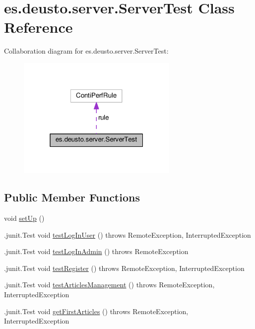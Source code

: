 \hypertarget{classes_1_1deusto_1_1server_1_1_server_test}{}\section{es.\+deusto.\+server.\+Server\+Test Class Reference}
\label{classes_1_1deusto_1_1server_1_1_server_test}


Collaboration diagram for es.\+deusto.\+server.\+Server\+Test\+:\nopagebreak
\begin{figure}[H]
\begin{center}
\leavevmode
\includegraphics[width=220pt]{classes_1_1deusto_1_1server_1_1_server_test__coll__graph}
\end{center}
\end{figure}
\subsection*{Public Member Functions}
\begin{DoxyCompactItemize}
\item 
void \hyperlink{classes_1_1deusto_1_1server_1_1_server_test_af715b0b972d52aaa4d90bf086f990921}{set\+Up} ()
\item 
.junit.\+Test void \hyperlink{classes_1_1deusto_1_1server_1_1_server_test_a7c2dd5cf5eb68dbf35b10f6c29b6734f}{test\+Log\+In\+User} ()  throws Remote\+Exception, Interrupted\+Exception 
\item 
.junit.\+Test void \hyperlink{classes_1_1deusto_1_1server_1_1_server_test_ade2896be992e43bbfb29ba455da9d335}{test\+Log\+In\+Admin} ()  throws Remote\+Exception 
\item 
.junit.\+Test void \hyperlink{classes_1_1deusto_1_1server_1_1_server_test_adb4299be45a2652280186729967b6f78}{test\+Register} ()  throws Remote\+Exception, Interrupted\+Exception 
\item 
.junit.\+Test void \hyperlink{classes_1_1deusto_1_1server_1_1_server_test_ae9706506ea1913688180ef68f900c73a}{test\+Articles\+Management} ()  throws Remote\+Exception, Interrupted\+Exception 
\item 
.junit.\+Test void \hyperlink{classes_1_1deusto_1_1server_1_1_server_test_a3e97ef887212fc0047e556559d9677ba}{get\+First\+Articles} ()  throws Remote\+Exception, Interrupted\+Exception 
\end{DoxyCompactItemize}
